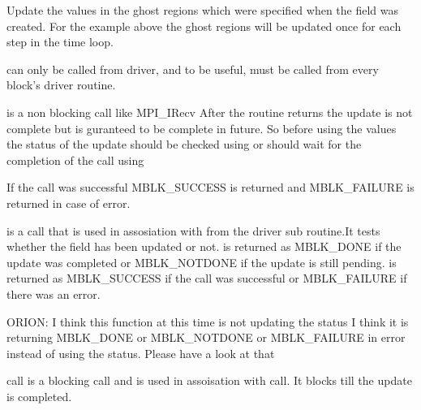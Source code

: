 \documentclass[10pt]{article}
\begin{document}
     Update the values in the ghost regions which were specified when the
     field was created. For the example above the ghost regions will be 
     updated once for each step in the time loop.

      can only be called from driver, and to be useful,
     must be called from every block's driver routine.

      is a non blocking call like MPI\_IRecv
     After the routine returns the update is not complete but is guranteed
     to be complete in future. So before using the values the status of the
     update should be checked using  or should wait
     for the completion of the call using 
     
     If the call was successful MBLK\_SUCCESS is 
     returned and MBLK\_FAILURE is returned in case of error.
\vspace{0.2in}


      is a call that is used in assosiation with 
      from the driver sub routine.It tests whether
      the field has been updated or not.
      is returned as MBLK\_DONE if the update was completed or 
      MBLK\_NOTDONE if the update is still pending.
      is returned as MBLK\_SUCCESS if the call was successful or 
     MBLK\_FAILURE if there was an error.


ORION: I think this function at this time is not updating the status I think it is returning MBLK\_DONE or MBLK\_NOTDONE or MBLK\_FAILURE in error instead of using the 
status. Please have a look at that
\vspace{0.2in}


      call is a blocking call and is used in assoisation 
     with  call. It blocks till the update is completed.
\vspace{0.2 in}


\end{document}
